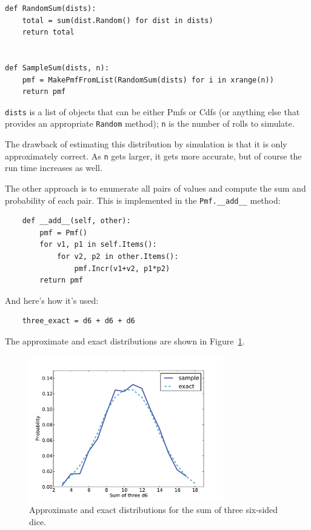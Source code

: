 \documentclass[12pt]{book}
\begin{document}
\begin{verbatim}
def RandomSum(dists):
    total = sum(dist.Random() for dist in dists)
    return total


def SampleSum(dists, n):
    pmf = MakePmfFromList(RandomSum(dists) for i in xrange(n))
    return pmf
\end{verbatim}

\verb"dists" is a list of objects that can be either
Pmfs or Cdfs (or anything else that provides an appropriate
\verb"Random" method); \verb"n" is the number of rolls to simulate.

The drawback of estimating this distribution by simulation is that
it is only approximately correct.  As \verb"n" gets larger, it gets
more accurate, but of course the run time increases as well.

The other approach is to enumerate all pairs of values and
compute the sum and probability of each pair.  This is implemented
in the \verb"Pmf.__add__" method:

\begin{verbatim}
    def __add__(self, other):
        pmf = Pmf()
        for v1, p1 in self.Items():
            for v2, p2 in other.Items():
                pmf.Incr(v1+v2, p1*p2)
        return pmf
\end{verbatim}

And here's how it's used:

\begin{verbatim}
    three_exact = d6 + d6 + d6
\end{verbatim}

The approximate and exact distributions are shown in
Figure~\ref{fig.dungeons1}.

\begin{figure}
\centerline{\includegraphics[height=2.5in]{figs/dungeons1.pdf}}
\caption{Approximate and exact distributions for the sum of
three six-sided dice.}
\label{fig.dungeons1}
\end{figure}
\end{document}
